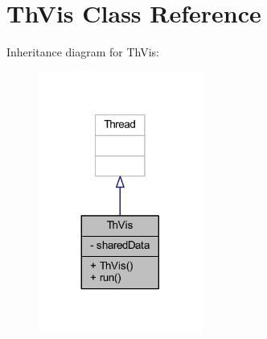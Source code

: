 \hypertarget{classmain_1_1_th_vis}{}\section{Th\+Vis Class Reference}
\label{classmain_1_1_th_vis}


Inheritance diagram for Th\+Vis\+:
\nopagebreak
\begin{figure}[H]
\begin{center}
\leavevmode
\includegraphics[width=152pt]{classmain_1_1_th_vis__inherit__graph}
\end{center}
\end{figure}


